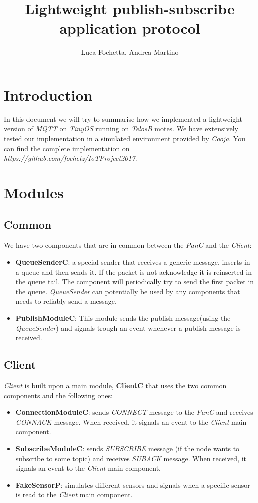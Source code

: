 \documentclass[10pt]{article}
\begin{document}
\title{Lightweight publish-subscribe application protocol}
\author{Luca Fochetta, Andrea Martino}

\maketitle


\section{Introduction}
In this document we will try to summarise how we implemented a lightweight version of \emph{MQTT} on \emph{TinyOS} running on \emph{TelosB} motes. We have extensively tested our implementation in a simulated environment provided by \emph{Cooja}. You can find the complete implementation on \emph{https://github.com/fochetz/IoTProject2017}.

\section{Modules}

\subsection{Common}
We have two components that are in common between the \emph{PanC} and the \emph{Client}:
\begin{itemize}
\item \textbf{QueueSenderC}: a special sender that receives a generic message, inserts in a queue and then sends it. If the packet is not acknowledge it is reinserted in the queue tail. The component will periodically try to send the first packet in the queue. \emph{QueueSender} can potentially be used by any components that needs to reliably send a message.
\item \textbf{PublishModuleC}: This module sends the publish message(using the \emph{QueueSender}) and signals trough an event whenever a publish message is received.
\end{itemize}

\subsection{Client}
\emph{Client} is built upon a main module, \textbf{ClientC} that uses the two common components and the following ones:
\begin{itemize}
\item \textbf{ConnectionModuleC}: sends \emph{CONNECT} message to the \emph{PanC} and receives \emph {CONNACK} message. When received, it signals an event to the \emph{Client} main component.
\item \textbf{SubscribeModuleC}: sends \emph{SUBSCRIBE} message (if the node wants to subscribe to some topic) and receives \emph{SUBACK} message. When received, it signals an event to the \emph{Client} main component.
\item \textbf{FakeSensorP}: simulates different sensors and signals when a specific sensor is read to the \emph{Client} main component.
\end{itemize}
\end{document}
